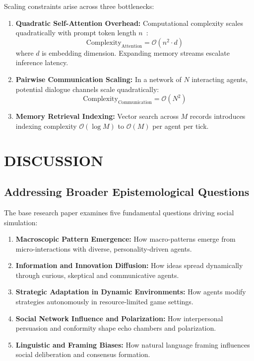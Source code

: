 \documentclass[12pt,a4paper]{report}
\begin{document}
Scaling constraints arise across three bottlenecks:
\begin{enumerate}[label=\arabic*.]
    \item \textbf{Quadratic Self-Attention Overhead:} Computational complexity scales quadratically with prompt token length $n$~\cite{vaswani2017attention}:
    \begin{equation}
    \text{Complexity}_{\text{Attention}} = \mathcal{O}(n^2 \cdot d)
    \end{equation}
    where $d$ is embedding dimension. Expanding memory streams escalate inference latency.
    \item \textbf{Pairwise Communication Scaling:} In a network of $N$ interacting agents, potential dialogue channels scale quadratically:
    \begin{equation}
    \text{Complexity}_{\text{Communication}} = \mathcal{O}(N^2)
    \end{equation}
    \item \textbf{Memory Retrieval Indexing:} Vector search across $M$ records introduces indexing complexity $\mathcal{O}(\log M)$ to $\mathcal{O}(M)$ per agent per tick.
\end{enumerate}


\chapter{DISCUSSION}
\label{chap:discussion}

\section{Addressing Broader Epistemological Questions}
\label{sec:epist_questions}

The base research paper examines five fundamental questions driving social simulation:
\begin{enumerate}[label=\arabic*.]
    \item \textbf{Macroscopic Pattern Emergence:} How macro-patterns emerge from micro-interactions with diverse, personality-driven agents.
    \item \textbf{Information and Innovation Diffusion:} How ideas spread dynamically through curious, skeptical and communicative agents.
    \item \textbf{Strategic Adaptation in Dynamic Environments:} How agents modify strategies autonomously in resource-limited game settings.
    \item \textbf{Social Network Influence and Polarization:} How interpersonal persuasion and conformity shape echo chambers and polarization.
    \item \textbf{Linguistic and Framing Biases:} How natural language framing influences social deliberation and consensus formation.
\end{enumerate}
\end{document}
